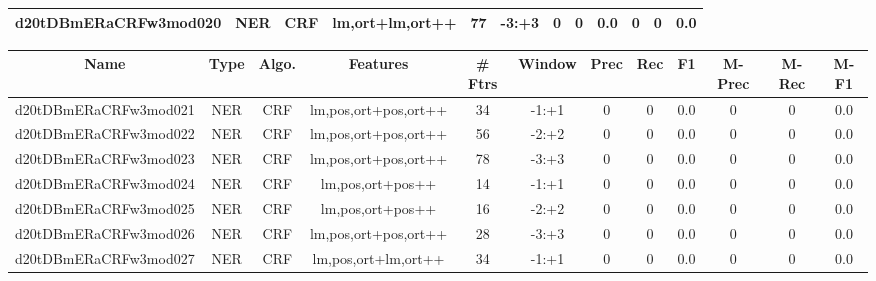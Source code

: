 \documentclass[a4paper]{article}
\begin{document}
\begin{landscape}
\begin{center}
\begin{tabular}{ |c|c|c|c|c|c|c|c|c|c|c|c|}
 
 	
 	\small{ d20tDBmERaCRFw3mod020 } & \small{ NER} & \small{  CRF }  & lm,ort+lm,ort++  &  77 &  \small{  -3:+3 }  &  0 & 0 & 0.0  &  0 & 0 & 0.0 \\
 	
 \hline
\end{tabular}
\end{center}




\begin{center}
\begin{tabular}{ |c|c|c|c|c|c|c|c|c|c|c|c|} 
 \hline
 	Name & Type & Algo. & Features & \# Ftrs & Window & Prec & Rec & F1 & M-Prec & M-Rec & M-F1\\
 \hline

 	

 
 	
 	\small{ d20tDBmERaCRFw3mod021 } & \small{ NER} & \small{  CRF }  & lm,pos,ort+pos,ort++  &  34 &  \small{  -1:+1 }  &  0 & 0 & 0.0  &  0 & 0 & 0.0 \\
 	

 
 	
 	\small{ d20tDBmERaCRFw3mod022 } & \small{ NER} & \small{  CRF }  & lm,pos,ort+pos,ort++  &  56 &  \small{  -2:+2 }  &  0 & 0 & 0.0  &  0 & 0 & 0.0 \\
 	

 
 	
 	\small{ d20tDBmERaCRFw3mod023 } & \small{ NER} & \small{  CRF }  & lm,pos,ort+pos,ort++  &  78 &  \small{  -3:+3 }  &  0 & 0 & 0.0  &  0 & 0 & 0.0 \\
 	

 
 	
 	\small{ d20tDBmERaCRFw3mod024 } & \small{ NER} & \small{  CRF }  & lm,pos,ort+pos++  &  14 &  \small{  -1:+1 }  &  0 & 0 & 0.0  &  0 & 0 & 0.0 \\
 	

 
 	
 	\small{ d20tDBmERaCRFw3mod025 } & \small{ NER} & \small{  CRF }  & lm,pos,ort+pos++  &  16 &  \small{  -2:+2 }  &  0 & 0 & 0.0  &  0 & 0 & 0.0 \\
 	

 
 	
 	\small{ d20tDBmERaCRFw3mod026 } & \small{ NER} & \small{  CRF }  & lm,pos,ort+pos,ort++  &  28 &  \small{  -3:+3 }  &  0 & 0 & 0.0  &  0 & 0 & 0.0 \\
 	

 
 	
 	\small{ d20tDBmERaCRFw3mod027 } & \small{ NER} & \small{  CRF }  & lm,pos,ort+lm,ort++  &  34 &  \small{  -1:+1 }  &  0 & 0 & 0.0  &  0 & 0 & 0.0 \\
 	


\end{tabular}
\end{center}
\end{landscape}
\end{document}
